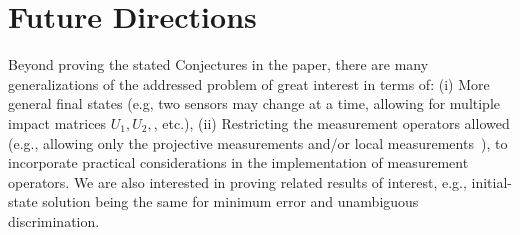 \section{Future Directions}

Beyond proving the stated Conjectures in the paper, there are many generalizations of the addressed
\iso problem of great interest in terms of: 
(i) More general final states (e.g, two sensors may change at a time, allowing for multiple impact matrices $U_1, U_2,$, etc.), 
(ii) Restricting the measurement operators allowed (e.g., allowing only the projective measurements and/or local measurements~\cite{umd-entanglement}), to incorporate practical considerations in the implementation of measurement operators. 
We are also interested in proving related results of interest, e.g., \iso initial-state solution being the same for minimum error and unambiguous discrimination.


